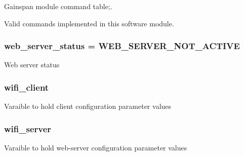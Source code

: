 Gainspan module command table;. 

Valid commands implemented in this software module. 
\subsubsection[{\texorpdfstring{web\+\_\+server\+\_\+status}{web_server_status}}]{ web\+\_\+server\+\_\+status = {\bf W\+E\+B\+\_\+\+S\+E\+R\+V\+E\+R\+\_\+\+N\+O\+T\+\_\+\+A\+C\+T\+I\+VE}}\hypertarget{group__wireless__interface_gaf05beffcad5d1d2018a346cfc8c813a1}{}\label{group__wireless__interface_gaf05beffcad5d1d2018a346cfc8c813a1}
Web server status 
\subsubsection[{\texorpdfstring{wifi\+\_\+client}{wifi_client}}]{ wifi\+\_\+client}\hypertarget{group__wireless__interface_gadbbf854f2e0f87372c26b3d29eedfd73}{}\label{group__wireless__interface_gadbbf854f2e0f87372c26b3d29eedfd73}
Varaible to hold client configuration parameter values 
\subsubsection[{\texorpdfstring{wifi\+\_\+server}{wifi_server}}]{ wifi\+\_\+server}\hypertarget{group__wireless__interface_gae4c1511ca93f3701dbf5b10cf287b2ad}{}\label{group__wireless__interface_gae4c1511ca93f3701dbf5b10cf287b2ad}
Varaible to hold web-\/server configuration parameter values 